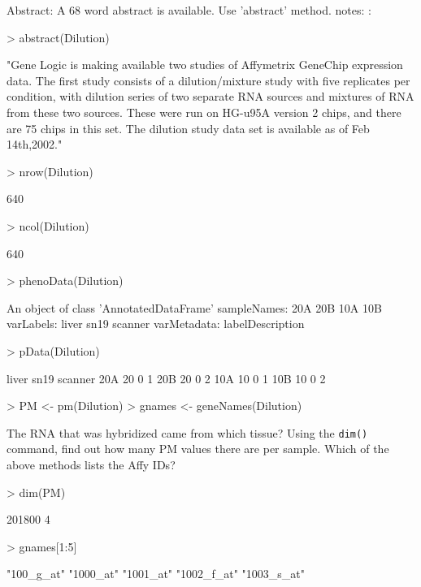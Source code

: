 \documentclass[12pt]{article}
\newcommand{\code}[1]{{\texttt{#1}}}
\begin{document}
\begin{Schunk}
\begin{Soutput}
  Abstract: A 68 word abstract is available. Use 'abstract' method.
  notes:
   :     
\end{Soutput}
\begin{Sinput}
> abstract(Dilution)
\end{Sinput}
\begin{Soutput}
[1] "Gene Logic is making available two studies of Affymetrix GeneChip expression data. The first study consists of a dilution/mixture study with five replicates per condition, with dilution series of two separate RNA sources and mixtures of RNA from these two sources. These were run on HG-u95A version 2 chips, and there are 75 chips in this set. The dilution study data set is available as of Feb 14th,2002.\n"
\end{Soutput}
\begin{Sinput}
> nrow(Dilution)
\end{Sinput}
\begin{Soutput}
[1] 640
\end{Soutput}
\begin{Sinput}
> ncol(Dilution)
\end{Sinput}
\begin{Soutput}
[1] 640
\end{Soutput}
\begin{Sinput}
> phenoData(Dilution)
\end{Sinput}
\begin{Soutput}
An object of class 'AnnotatedDataFrame'
  sampleNames: 20A 20B 10A 10B
  varLabels: liver sn19 scanner
  varMetadata: labelDescription
\end{Soutput}
\begin{Sinput}
> pData(Dilution)
\end{Sinput}
\begin{Soutput}
    liver sn19 scanner
20A    20    0       1
20B    20    0       2
10A    10    0       1
10B    10    0       2
\end{Soutput}
\begin{Sinput}
> PM <- pm(Dilution)
> gnames <- geneNames(Dilution)
\end{Sinput}
\end{Schunk}

The RNA that was hybridized came from which tissue?  Using the \code{dim()} command, find out how many PM values there are per  sample.  Which of the above methods lists the Affy IDs?

\begin{Schunk}
\begin{Sinput}
> dim(PM)
\end{Sinput}
\begin{Soutput}
[1] 201800      4
\end{Soutput}
\begin{Sinput}
> gnames[1:5]
\end{Sinput}
\begin{Soutput}
[1] "100_g_at"  "1000_at"   "1001_at"   "1002_f_at" "1003_s_at"
\end{Soutput}
\end{Schunk}
\end{document}
